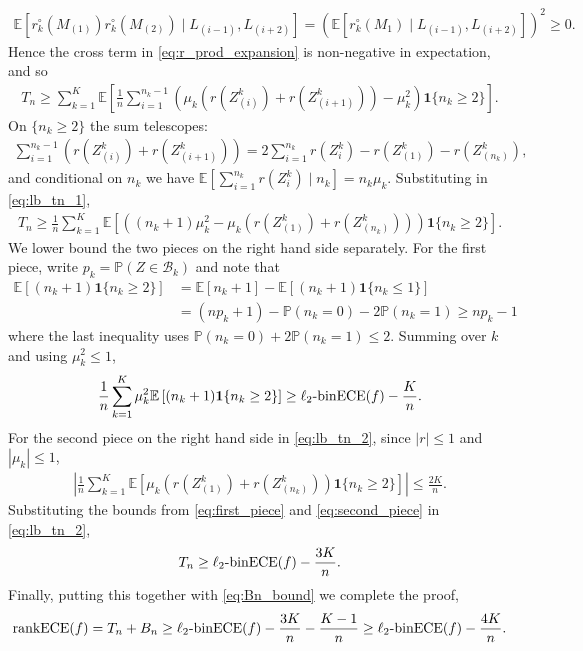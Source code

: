 \documentclass[11pt]{article}
\numberwithin{equation}{section}
\theoremstyle{definition}
\newcommand{\E}{\mathbb{E}}
\renewcommand{\P}{\mathbb{P}}
\newcommand{\cB}{\mathcal{B}}
\newcommand{\one}{\bm{1}}
\newcommand{\binECE}{\mathrm{binECE}}
\newcommand{\lbinECE}{\ell_2\textnormal{-}\binECE}
\newcommand{\rankECE}{\mathrm{rankECE}}
\begin{document}
\begin{align*}
    \E\left[r_k^\circ\left(M_{(1)}\right)r_k^\circ\left(M_{(2)}\right)\mid L_{(i-1)}, L_{(i+2)}\right] = \left(\E\left[r_k^\circ(M_1)\mid L_{(i-1)}, L_{(i+2)}\right]\right)^2 \geq 0.
\end{align*}
Hence the cross term in \eqref{eq:r_prod_expansion} is non-negative in expectation, and so
\begin{align}\label{eq:lb_tn_1}
    T_n \geq \sum_{k=1}^{K}\E\left[\frac{1}{n}\sum_{i=1}^{n_k-1}\left(\mu_k\left(r(Z_{(i)}^k) + r(Z_{(i+1)}^k)\right) - \mu_k^2\right)\one\{n_k\geq 2\}\right].
\end{align}
On $\{n_k\geq 2\}$ the sum telescopes:
\begin{align*}
    \sum_{i=1}^{n_k-1}\left(r(Z_{(i)}^k) + r(Z_{(i+1)}^k)\right) = 2\sum_{i=1}^{n_k}r(Z_i^k) - r(Z_{(1)}^k) - r(Z_{(n_k)}^k),
\end{align*}
and conditional on $n_k$ we have $\E[\sum_{i=1}^{n_k}r(Z_i^k)\mid n_k] = n_k\mu_k$. Substituting in \eqref{eq:lb_tn_1},
\begin{align}\label{eq:lb_tn_2}
    T_n \geq \frac{1}{n}\sum_{k=1}^{K}\E\left[\left((n_k+1)\mu_k^2 - \mu_k\left(r(Z_{(1)}^k) + r(Z_{(n_k)}^k)\right)\right)\one\{n_k\geq 2\}\right].
\end{align}
We lower bound the two pieces on the right hand side separately. For the first piece, write $p_k = \P(Z\in \cB_k)$ and note that
\begin{align*}
    \E\left[(n_k+1)\one\{n_k\geq 2\}\right]
    & = \E[n_k+1] - \E\left[(n_k+1)\one\{n_k\leq 1\}\right]\\
    & = (np_k + 1) - \P(n_k = 0) - 2\P(n_k = 1)\geq np_k - 1
\end{align*}
where the last inequality uses $\P(n_k = 0) + 2\P(n_k = 1)\leq 2$. Summing over $k$ and using $\mu_k^2\leq 1$,
\begin{align}\label{eq:first_piece}
    \frac{1}{n}\sum_{k=1}^{K}\mu_k^2\E\left[(n_k+1)\one\{n_k\geq 2\}\right]\geq \lbinECE(f) - \frac{K}{n}.
\end{align}
For the second piece on the right hand side in \eqref{eq:lb_tn_2}, since $|r|\leq 1$ and $|\mu_k|\leq 1$,
\begin{align}\label{eq:second_piece}
    \left|\frac{1}{n}\sum_{k=1}^{K}\E\left[\mu_k\left(r(Z_{(1)}^k) + r(Z_{(n_k)}^k)\right)\one\{n_k\geq 2\}\right]\right|\leq \frac{2K}{n}.
\end{align}
Substituting the bounds from \eqref{eq:first_piece} and \eqref{eq:second_piece} in \eqref{eq:lb_tn_2},
\begin{align*}
    T_n\geq \lbinECE(f) - \frac{3K}{n}.
\end{align*}
Finally, putting this together with \eqref{eq:Bn_bound} we complete the proof,
\begin{align*}
    \rankECE(f) = T_n + B_n \geq \lbinECE(f) - \frac{3K}{n} - \frac{K-1}{n}\geq \lbinECE(f) - \frac{4K}{n}.
\end{align*}
\end{document}
